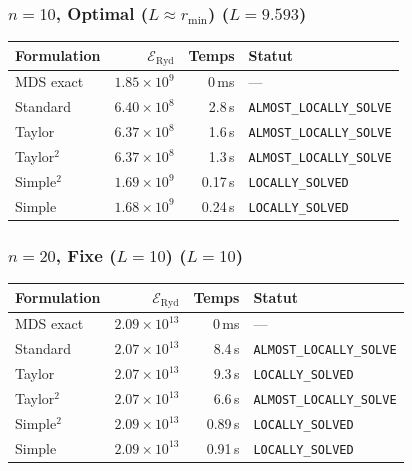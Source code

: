 \subsubsection{$n=10$, Optimal ($L{\approx}r_{\min}$) ($L=9.593$)}
\begin{longtable}{@{}lrrl@{}}
  \toprule
  Formulation & $\mathcal{E}_{\mathrm{Ryd}}$ & Temps & Statut \\
  \midrule
  \endhead
  MDS exact & $1.85\times10^{9}$ & 0\,ms & --- \\
  Standard & $6.40\times10^{8}$ & 2.8\,s & \texttt{ALMOST\_LOCALLY\_SOLVE} \\
  Taylor & $6.37\times10^{8}$ & 1.6\,s & \texttt{ALMOST\_LOCALLY\_SOLVE} \\
  Taylor$^2$ & $6.37\times10^{8}$ & 1.3\,s & \texttt{ALMOST\_LOCALLY\_SOLVE} \\
  Simple$^2$ & $1.69\times10^{9}$ & 0.17\,s & \texttt{LOCALLY\_SOLVED} \\
  Simple & $1.68\times10^{9}$ & 0.24\,s & \texttt{LOCALLY\_SOLVED} \\
  \bottomrule
\end{longtable}

\subsubsection{$n=20$, Fixe ($L{=}10$) ($L=10$)}
\begin{longtable}{@{}lrrl@{}}
  \toprule
  Formulation & $\mathcal{E}_{\mathrm{Ryd}}$ & Temps & Statut \\
  \midrule
  \endhead
  MDS exact & $2.09\times10^{13}$ & 0\,ms & --- \\
  Standard & $2.07\times10^{13}$ & 8.4\,s & \texttt{ALMOST\_LOCALLY\_SOLVE} \\
  Taylor & $2.07\times10^{13}$ & 9.3\,s & \texttt{LOCALLY\_SOLVED} \\
  Taylor$^2$ & $2.07\times10^{13}$ & 6.6\,s & \texttt{ALMOST\_LOCALLY\_SOLVE} \\
  Simple$^2$ & $2.09\times10^{13}$ & 0.89\,s & \texttt{LOCALLY\_SOLVED} \\
  Simple & $2.09\times10^{13}$ & 0.91\,s & \texttt{LOCALLY\_SOLVED} \\
  \bottomrule
\end{longtable}

